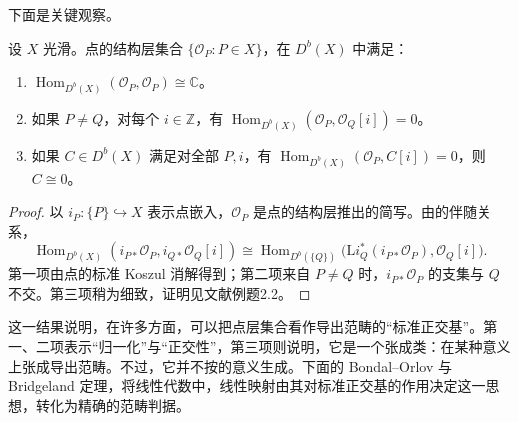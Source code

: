 下面是关键观察。
\begin{proposition}\label{prop:4.75}
设 $X$ 光滑。点的结构层集合 $\{\mathcal{O}_P:P\in X\}$，在 $D^b(X)$ 中满足：
\begin{enumerate}[label=(\arabic*)]
\item $\operatorname{Hom}_{D^b(X)}(\mathcal{O}_P,\mathcal{O}_P)\cong\mathbb{C}$。
\item 如果 $P\ne Q$，对每个 $i\in\mathbb{Z}$，有 $\operatorname{Hom}_{D^b(X)}(\mathcal{O}_P,\mathcal{O}_Q[i])=0$。
\item 如果 $C\in D^b(X)$ 满足对全部 $P,i$，有 $\operatorname{Hom}_{D^b(X)}(\mathcal{O}_P,C[i])=0$，则 $C\cong0$。
\end{enumerate}
\end{proposition}
\begin{proof}
以 $i_P\colon\{P\}\hookrightarrow X$ 表示点嵌入，$\mathcal{O}_P$ 是点的结构层推出的简写。由的伴随关系，
\[
\operatorname{Hom}_{D^b(X)}(i_{P*}\mathcal{O}_P,i_{Q*}\mathcal{O}_Q[i])
\cong\operatorname{Hom}_{D^b(\{Q\})}
\bigl(\mathrm{L}i_Q^*(i_{P*}\mathcal{O}_P),\mathcal{O}_Q[i]\bigr).
\]
第一项由点的标准 Koszul 消解得到；第二项来自 $P\ne Q$ 时，$i_{P*}\mathcal{O}_P$ 的支集与 $Q$ 不交。第三项稍为细致，证明见文献例题2.2。\BookQED
\end{proof}

这一结果说明，在许多方面，可以把点层集合看作导出范畴的“标准正交基”。第一、二项表示“归一化”与“正交性”，第三项则说明，它是一个张成类：在某种意义上张成导出范畴。不过，它并不按的意义生成。下面的 Bondal--Orlov 与 Bridgeland 定理，将线性代数中，线性映射由其对标准正交基的作用决定这一思想，转化为精确的范畴判据。

